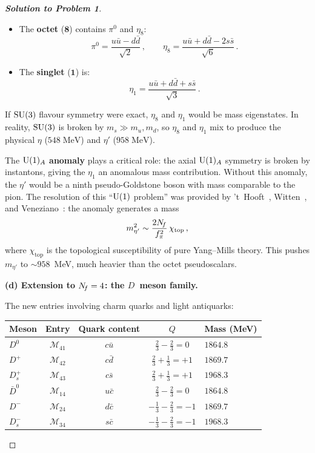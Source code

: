 \documentclass[11pt,a4paper]{article}
\begin{document}
\begin{proof}[\textbf{Solution to Problem 1}]
\begin{itemize}
  \item The \textbf{octet} ($\mathbf{8}$) contains $\pi^0$ and
    $\eta_8$:
    \[
      \pi^0 = \frac{u\bar{u} - d\bar{d}}{\sqrt{2}}\,,\qquad
      \eta_8 = \frac{u\bar{u} + d\bar{d} - 2s\bar{s}}{\sqrt{6}}\,.
    \]
  \item The \textbf{singlet} ($\mathbf{1}$) is:
    \[
      \eta_1 = \frac{u\bar{u} + d\bar{d} + s\bar{s}}{\sqrt{3}}\,.
    \]
\end{itemize}

If $\mathrm{SU}(3)$ flavour symmetry were exact, $\eta_8$ and $\eta_1$ would
be mass eigenstates.  In reality, $\mathrm{SU}(3)$ is broken by
$m_s \gg m_u, m_d$, so $\eta_8$ and $\eta_1$ mix to produce the
physical $\eta$ ($548\;\text{MeV}$) and $\eta'$ ($958\;\text{MeV}$).

The \textbf{$\mathrm{U}(1)_A$ anomaly} plays a critical role: the axial
$\mathrm{U}(1)_A$ symmetry is broken by instantons, giving the $\eta_1$ an
anomalous mass contribution.  Without this anomaly, the $\eta'$ would
be a ninth pseudo-Goldstone boson with mass comparable to the pion.
The resolution of this ``$\mathrm{U}(1)$ problem'' was provided by
't~Hooft~\cite{tHooft1976}, Witten~\cite{Witten1979VenCre}, and
Veneziano~\cite{Veneziano1979}: the anomaly generates a mass
\[
  m_{\eta'}^2 \sim \frac{2N_{\!f}}{f_\pi^2}\,\chi_{\text{top}}\,,
\]
where $\chi_{\text{top}}$ is the topological susceptibility of
pure Yang--Mills theory.  This pushes $m_{\eta'}$ to $\sim 958$~MeV,
much heavier than the octet pseudoscalars.

\bigskip

\textbf{(d) Extension to $N_{\!f} = 4$: the $D$~meson family.}

The new entries involving charm quarks and light antiquarks:

\renewcommand{\arraystretch}{1.3}
\begin{center}
\begin{tabular}{l c c c l}
\toprule
\textbf{Meson} & \textbf{Entry} & \textbf{Quark content} & $Q$ &
  \textbf{Mass (MeV)} \\
\midrule
$D^0$ & $\mathcal{M}_{41}$ & $c\bar{u}$
  & $\tfrac{2}{3} - \tfrac{2}{3} = 0$ & $1864.8$ \\
$D^+$ & $\mathcal{M}_{42}$ & $c\bar{d}$
  & $\tfrac{2}{3} + \tfrac{1}{3} = +1$ & $1869.7$ \\
$D_s^+$ & $\mathcal{M}_{43}$ & $c\bar{s}$
  & $\tfrac{2}{3} + \tfrac{1}{3} = +1$ & $1968.3$ \\
$\bar{D}^0$ & $\mathcal{M}_{14}$ & $u\bar{c}$
  & $\tfrac{2}{3} - \tfrac{2}{3} = 0$ & $1864.8$ \\
$D^-$ & $\mathcal{M}_{24}$ & $d\bar{c}$
  & $-\tfrac{1}{3} - \tfrac{2}{3} = -1$ & $1869.7$ \\
$D_s^-$ & $\mathcal{M}_{34}$ & $s\bar{c}$
  & $-\tfrac{1}{3} - \tfrac{2}{3} = -1$ & $1968.3$ \\
\bottomrule
\end{tabular}
\end{center}


\end{proof}
\end{document}

